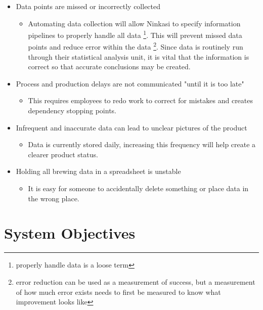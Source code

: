 \documentclass[draftclsnofoot,onecolumn,letterpaper,10pt]{IEEEtran}
\begin{document}
\begin{itemize}
	\item {Data points are missed or incorrectly collected}
      		\begin{itemize}
			\item {Automating data collection will allow Ninkasi to specify information pipelines to properly handle all data \footnote{properly handle data is a loose term}. This will prevent missed data points and reduce error within the data \footnote{error reduction can be used as a measurement of success, but a measurement of how much error exists needs to first be measured to know what improvement looks like}. Since data is routinely run through their statistical analysis unit, it is vital that the information is correct so that accurate conclusions may be created.}
      		\end{itemize}

	\item {Process and production delays are not communicated "until it is too late"}
		\begin{itemize}
			\item {This requires employees to redo work to correct for mistakes and creates dependency stopping points.}
		\end{itemize}

	\item {Infrequent and inaccurate data can lead to unclear pictures of the product}
		\begin{itemize}
			\item {Data is currently stored daily, increasing this frequency will help create a clearer product status.}
		\end{itemize}

	\item {Holding all brewing data in a spreadsheet is unstable}
		\begin{itemize}
			\item {It is easy for someone to accidentally delete something or place data in the wrong place.}
		\end{itemize}

	\end{itemize}


\section{\textbf{System Objectives}}
\end{document}
